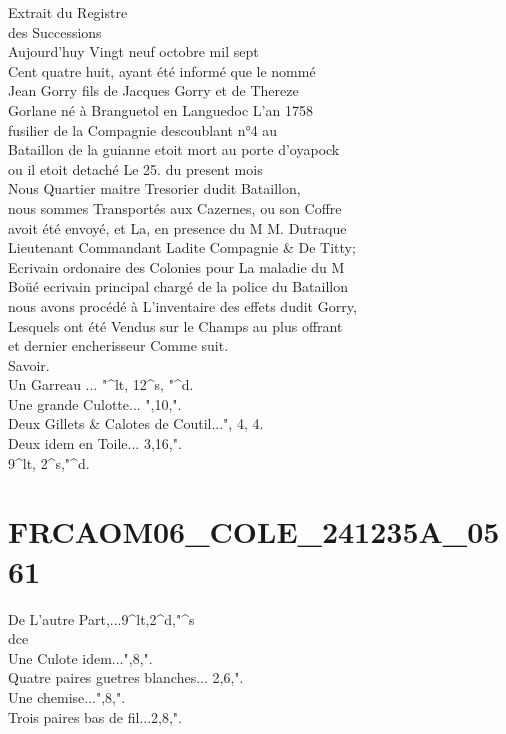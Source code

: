 \documentclass{article}
\begin{document}
\begin{pages}
Extrait du Registre\\
des Successions\\
Aujourd'huy Vingt neuf octobre mil sept\\
Cent quatre huit, ayant été informé que le nommé\\
Jean Gorry fils de Jacques Gorry et de Thereze\\
Gorlane né à Branguetol en Languedoc L'an 1758\\
fusilier de la Compagnie descoublant n°4 au\\
Bataillon de la guianne etoit mort au porte d'oyapock\\
ou il etoit detaché Le 25. du present mois\\
Nous Quartier maitre Tresorier dudit Bataillon,\\
nous sommes Transportés aux Cazernes, ou son Coffre\\
avoit été envoyé, et La, en presence du M M. Dutraque\\
Lieutenant Commandant Ladite Compagnie \& De Titty;\\
Ecrivain ordonaire des Colonies pour La maladie du M\\
Boüé ecrivain principal chargé de la police du Bataillon\\
nous avons procédé à L'inventaire des effets dudit Gorry,\\
Lesquels ont été Vendus sur le Champs au plus offrant\\
et dernier encherisseur Comme suit.\\
Savoir.\\
Un Garreau ... "\^{}lt, 12\^{}s, "\^{}d.\\
Une grande Culotte... ",10,".\\
Deux Gillets \& Calotes de Coutil...", 4, 4.\\
Deux idem en Toile... 3,16,".\\
9\^{}lt, 2\^{}s,"\^{}d.
\pend
\endnumbering\beginnumbering\section{FRCAOM06\_COLE\_241235A\_0561}\pstart
De L'autre Part,...9\^{}lt,2\^{}d,"\^{}s\\
dce\\
Une Culote idem...",8,".\\
Quatre paires guetres blanches... 2,6,".\\
Une chemise...",8,".\\
Trois paires bas de fil...2,8,".\\

\end{pages}
\end{document}
